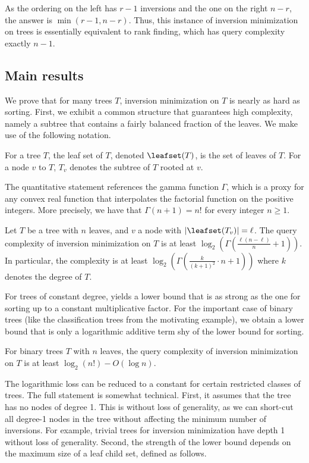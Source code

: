 \documentclass{toc}
\begin{document}
As the ordering on the left has $r-1$ inversions and the one on the right $n-r$, the answer is $\min(r-1,n-r)$. Thus, this instance of inversion minimization on trees is essentially equivalent to rank finding, which has query complexity exactly $n-1$.

\subsection{Main results} 
%
We prove that for many trees $T$, inversion minimization on $T$ is nearly as hard as sorting. First, we exhibit a common structure that guarantees high complexity, namely a subtree that contains a fairly balanced fraction of the leaves. We make use of the following notation.
\begin{definition}
For a tree $T$, the leaf set of $T$, denoted $\leafset(T)$, is the set of leaves of $T$. For a node $v$ to $T$, $T_v$ denotes the subtree of $T$ rooted at $v$.
\end{definition}
The quantitative statement references the gamma function $\Gamma$, which is a proxy for any convex real function that interpolates the factorial function on the positive integers.  More precisely, %
we have that $\Gamma(n+1) = n!$ for every integer $n \ge 1$.
%
\begin{theorem}\label{thm:main:general}
Let $T$ be a tree with $n$ leaves, and $v$ a node with $\lvert\leafset(T_v)\rvert = \ell$. The query complexity of inversion minimization on $T$ is at least $\log_2(\Gamma( \frac{\ell(n-\ell)}{n}+1 ))$. In particular, the complexity is at least $\log_2(\Gamma(\frac{k}{(k+1)^2} \cdot n+1))$ where $k$ denotes the degree of $T$.
\end{theorem}
For trees of constant degree,  yields a lower bound that is as strong as the one for sorting up to a constant multiplicative factor. For the important case of binary trees (like the classification trees from the motivating example), we obtain a lower bound that is only a logarithmic additive term shy of the lower bound for sorting.
\begin{theorem}\label{thm:main:binary}
For binary trees $T$ with $n$ leaves, the query complexity of inversion minimization on $T$ is at least $\log_2(n!) - O(\log n)$.
\end{theorem}
The logarithmic loss can be reduced to a constant for certain restricted classes of trees. The full statement is somewhat technical. First, it assumes that the tree has no nodes of degree 1. This is without loss of generality, as we can short-cut all degree-1 nodes in the tree without affecting the minimum number of inversions. For example, trivial trees for inversion minimization have depth 1 without loss of generality. Second, the strength of the lower bound depends on the maximum size of a leaf child set, defined as follows.
\end{document}
